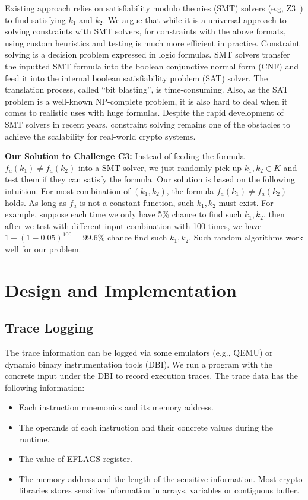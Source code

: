 Existing approach relies on satisfiability modulo theories (SMT) solvers (e.g,
Z3~\cite{DeMoura:2008:ZES:1792734.1792766}) to find satisfying $k_1$ and $k_2$.
We argue that while it is a universal approach to solving constraints with SMT
solvers, for constraints with the above formats, using custom heuristics and
testing is much more efficient in practice. Constraint solving is a decision
problem expressed in logic formulas. SMT solvers transfer the inputted SMT
formula into the boolean conjunctive normal form (CNF) and feed it into the
internal boolean satisfiability problem (SAT) solver. The translation process,
called ``bit blasting'', is time-consuming. Also, as the SAT problem is a
well-known NP-complete problem, it is also hard to deal when it comes to
realistic uses with huge formulas. Despite the rapid development of SMT solvers
in recent years, constraint solving remains one of the obstacles to achieve the
scalability for real-world crypto systems.

\vspace*{2pt}
\textbf{Our Solution to Challenge C3:}
Instead of feeding the formula $f_a(k_1) \neq f_a(k_2)$ into a SMT solver, we
just randomly pick up $k_1, k_2 \in K$ and test them if they can satisfy the
formula. Our solution is based on the following intuition. For most combination
of $(k_{1}, k_{2} )$, the formula $f_a(k_1) \neq f_a(k_2)$ holds. As long as
$f_a$ is not a constant function, such $k_1, k_2$ must exist. For example,
suppose each time we only have 5\% chance to find such $k_1, k_2$, then after we
test with different input combination with 100 times, we have $1 -
(1-0.05)^{100} = 99.6\%$ chance find such $k_1, k_2$. Such random algorithms
work well for our problem.

\section{Design and Implementation}
\subsection{Trace Logging}
The trace information can be logged via some emulators (e.g., QEMU) or dynamic binary instrumentation tools (DBI). 
We run a program with the concrete input under the DBI to record execution traces.
The trace data has the following information:
\begin{itemize}
     \item Each instruction mnemonics and its memory address.
     \item The operands of each instruction and their concrete values during the runtime.
     \item The value of EFLAGS register. 
     \item The memory address and the length of the sensitive information.
      Most crypto libraries stores sensitive information in arrays,
      variables or contiguous buffer.
\end{itemize}

